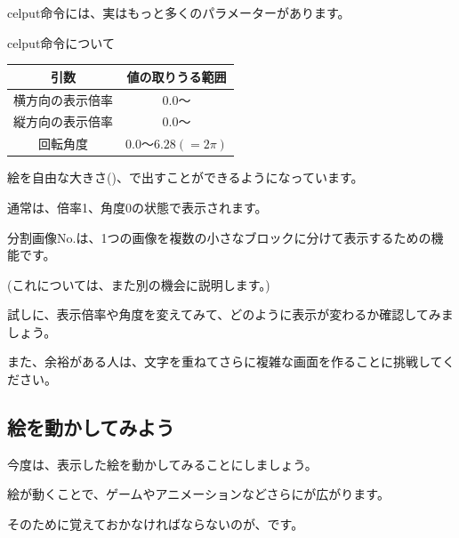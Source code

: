 \documentclass[text04.tex]{subfiles}
\begin{document}
celput命令には、実はもっと多くのパラメーターがあります。



\begin{itembox}[c]{celput命令について}
    \begin{center}
    \end{center}
    \begin{center}
        \begin{tabular}{cc} \hline
            引数 & 値の取りうる範囲 \\ \hline
            横方向の表示倍率 & $0.0〜$ \\
            縦方向の表示倍率 & $0.0〜$ \\
            回転角度 & $0.0〜6.28(=2\pi)$ \\ \hline
        \end{tabular}
    \end{center}
\end{itembox}

絵を自由な大きさ()、で出すことができるようになっています。

通常は、倍率1、角度0の状態で表示されます。

分割画像No.は、1つの画像を複数の小さなブロックに分けて表示するための機能です。

(これについては、また別の機会に説明します。)

試しに、表示倍率や角度を変えてみて、どのように表示が変わるか確認してみましょう。

また、余裕がある人は、文字を重ねてさらに複雑な画面を作ることに挑戦してください。



\newpage
\subsection{絵を動かしてみよう}



今度は、表示した絵を動かしてみることにしましょう。

絵が動くことで、ゲームやアニメーションなどさらにが広がります。

そのために覚えておかなければならないのが、です。
\end{document}
